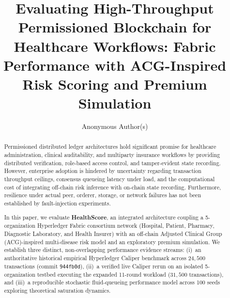 \documentclass[runningheads]{llncs}
\begin{document}
\title{Evaluating High-Throughput Permissioned Blockchain for Healthcare Workflows: Fabric Performance with ACG-Inspired Risk Scoring and Premium Simulation}

\author{Anonymous Author(s)}


\maketitle

\begin{abstract}
\sloppy
Permissioned distributed ledger architectures hold significant promise for healthcare administration, clinical auditability, and multiparty insurance workflows by providing distributed verification, role-based access control, and tamper-evident state recording. However, enterprise adoption is hindered by uncertainty regarding transaction throughput ceilings, consensus queueing latency under load, and the computational cost of integrating off-chain risk inference with on-chain state recording. Furthermore, resilience under actual peer, orderer, storage, or network failures has not been established by fault-injection experiments.

In this paper, we evaluate \textbf{HealthScore}, an integrated architecture coupling a 5-organization Hyperledger Fabric consortium network (Hospital, Patient, Pharmacy, Diagnostic Laboratory, and Health Insurer) with an off-chain Adjusted Clinical Group (ACG)-inspired multi-disease risk model and an exploratory premium simulation. We establish three distinct, non-overlapping performance evidence streams: (i)~an authoritative historical empirical Hyperledger Caliper benchmark across $24,500$ transactions (commit \texttt{944fb0d}), (ii)~a verified live Caliper rerun on an isolated 5-organization testbed executing the expanded 11-round workload ($31,500$ transactions), and (iii)~a reproducible stochastic fluid-queueing performance model across 100 seeds exploring theoretical saturation dynamics.


\end{abstract}
\end{document}

